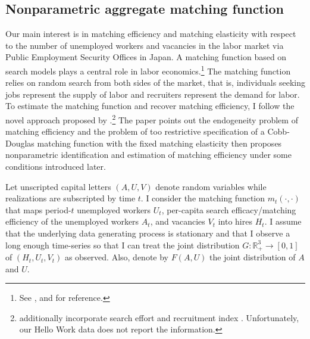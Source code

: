 \documentclass[12pt]{article}
\begin{document}
\subsection{Nonparametric aggregate matching function}
Our main interest is in matching efficiency and matching elasticity with respect to the number of unemployed workers and vacancies in the labor market via Public Employment Security Offices in Japan.
A matching function based on search models plays a central role in labor economics.\footnote{See \cite{pissarides2000equilibrium,petrongolo2001looking}, and \cite{rogerson2005search} for reference.} 
The matching function relies on random search from both sides of the market, that is, individuals seeking jobs represent the supply of labor and recruiters represent the demand for labor.
To estimate the matching function and recover matching efficiency, I follow the novel approach proposed by \cite{lange2020beyond}.\footnote{\cite{lange2020beyond} additionally incorporate search effort \citep{mukoyama2018job} and recruitment index \citep{davis2013establishment}. Unfortunately, our Hello Work data does not report the information.}
The paper points out the endogeneity problem of matching efficiency \citep{borowczyk2013accounting} and the problem of too restrictive specification of a Cobb-Douglas matching function with the fixed matching elasticity then proposes nonparametric identification and estimation of matching efficiency under some conditions introduced later.

Let unscripted capital letters $(A, U, V)$ denote random variables while realizations are subscripted by time $t$. 
I consider the matching function $m_t(\cdot,\cdot)$ that maps period-$t$ unemployed workers $U_t$, per-capita search efficacy/matching efficiency of the unemployed workers $A_t$, and vacancies $V_t$ into hires $H_t$.
I assume that the underlying data generating process is stationary and that I observe a long enough time-series so that I can treat the joint distribution $G: \mathbb{R}_{+}^3 \rightarrow[0,1]$ of $\left(H_t, U_t, V_t\right)$ as observed. 
Also, denote by $F(A, U)$ the joint distribution of $A$ and $U$.
\end{document}
